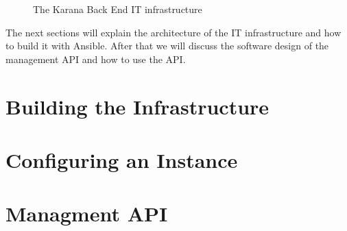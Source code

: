 \documentclass[draft=false,
10pt, %
a4paper, %
oneside, %
headinclude,footinclude, %
]{scrartcl}
\begin{document}
\begin{figure}
\begin{tikzpicture}
	\end{tikzpicture}
	\caption[KBE IT infrastructure]{The Karana Back End IT infrastructure} %
	\label{figure:infrastructrue}
\end{figure}

The next sections will explain  the architecture of the IT infrastructure and how to build it with Ansible. After that we will discuss the software design of the management API and how to use the API. 
 

\section{Building the Infrastructure}\label{section:infrastructure}



\section{Configuring an Instance}\label{section:instance}




\section{Managment API}



\renewcommand{\refname}{\spacedlowsmallcaps{References}} %




\end{document}
